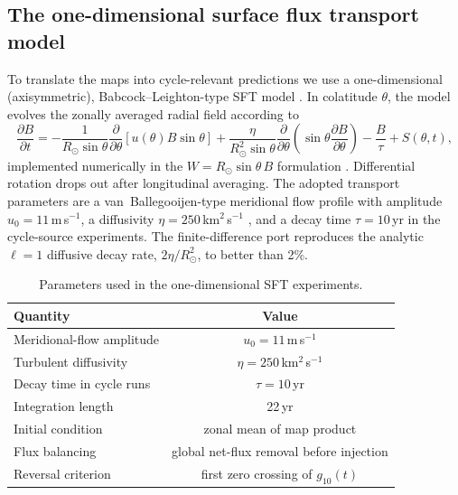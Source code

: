 \documentclass{aa}
\begin{document}
\subsection{The one-dimensional surface flux transport model}
\label{sec:methods-sft}

To translate the maps into cycle-relevant predictions we use a one-dimensional (axisymmetric), Babcock--Leighton-type SFT model \citep{Babcock1961,Leighton1969,Sheeley2005}. In colatitude $\theta$, the model evolves the zonally averaged radial field according to
\begin{equation}
\frac{\partial B}{\partial t} =
-\frac{1}{R_\odot\sin\theta}
\frac{\partial}{\partial\theta}
\left[u(\theta) B \sin\theta\right]
+
\frac{\eta}{R_\odot^2\sin\theta}
\frac{\partial}{\partial\theta}
\left(\sin\theta\frac{\partial B}{\partial\theta}\right)
-\frac{B}{\tau}+S(\theta,t),
\label{eq:sft}
\end{equation}
implemented numerically in the $W = R_\odot \sin\theta\,B$ formulation \citep{WangSheeley1991}. Differential rotation drops out after longitudinal averaging. The adopted transport parameters are a van~Ballegooijen-type meridional flow profile with amplitude $u_0 = 11$\,m\,s$^{-1}$, a diffusivity $\eta = 250$\,km$^2$\,s$^{-1}$ \citep{vanBallegooijen1998,Wang2017}, and a decay time $\tau = 10$\,yr in the cycle-source experiments. The finite-difference port reproduces the analytic $\ell = 1$ diffusive decay rate, $2\eta/R_\odot^2$, to better than 2\%.

\begin{table}
\caption{Parameters used in the one-dimensional SFT experiments.}
\label{tab:sft-params}
\centering
\footnotesize
\begin{tabular}{lc}
\hline\hline
Quantity & Value \\
\hline
Meridional-flow amplitude & $u_0=11$\,m\,s$^{-1}$ \\
Turbulent diffusivity & $\eta=250$\,km$^2$\,s$^{-1}$ \\
Decay time in cycle runs & $\tau=10$\,yr \\
Integration length & 22\,yr \\
Initial condition & zonal mean of map product \\
Flux balancing & global net-flux removal before injection \\
Reversal criterion & first zero crossing of $g_{10}(t)$ \\
\hline
\end{tabular}
\end{table}
\end{document}
